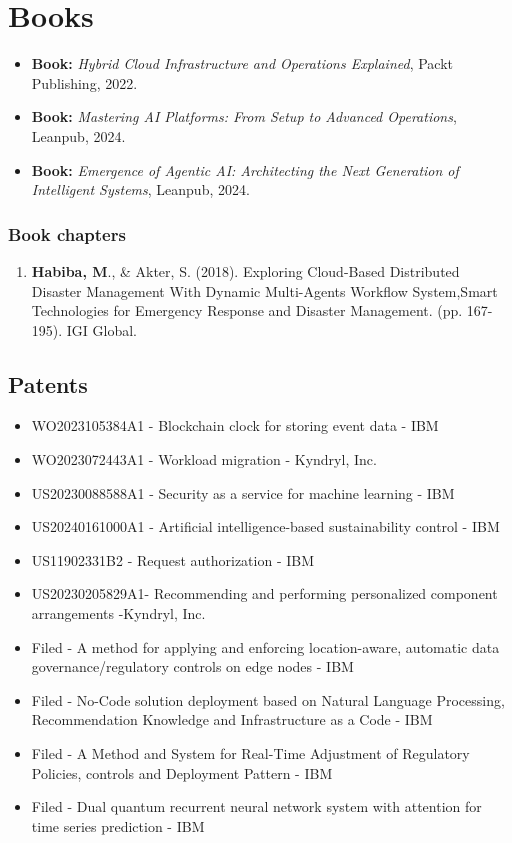 \documentclass[12pt,parskip=half]{scrartcl}
\begin{document}
\section*{Books}
\begin{itemize}
    \item \textbf{Book:} \emph{Hybrid Cloud Infrastructure and Operations Explained}, Packt Publishing, 2022.
    \item \textbf{Book:} \emph{Mastering AI Platforms: From Setup to Advanced Operations}, Leanpub, 2024.
    \item \textbf{Book:} \emph{Emergence of Agentic AI: Architecting the Next Generation of Intelligent Systems}, Leanpub, 2024.
\end{itemize}

\subsubsection{Book chapters}\label{book-chapters}

\begin{enumerate}
  \leftskip-0.13in %
  \item \textbf{Habiba, M}., \& Akter, S. (2018). Exploring Cloud-Based Distributed Disaster Management With Dynamic Multi-Agents Workflow System,Smart Technologies for Emergency Response and Disaster Management. (pp. 167-195). IGI Global.
\end{enumerate}


\vspace{0.3cm}

\subsection{Patents}

\begin{itemize}
    \item WO2023105384A1 - Blockchain clock for storing event data - IBM
    \item WO2023072443A1 - Workload migration - Kyndryl, Inc.
    \item US20230088588A1 - Security as a service for machine learning - IBM
    \item US20240161000A1 - Artificial intelligence-based sustainability control - IBM
    \item US11902331B2 - Request authorization - IBM
    \item US20230205829A1- Recommending and performing personalized component arrangements -Kyndryl, Inc.
    \item Filed - A method for applying and enforcing location-aware, automatic data governance/regulatory controls on edge nodes - IBM
    \item Filed - No-Code solution deployment based on Natural Language Processing, Recommendation Knowledge and Infrastructure as a Code - IBM 
    \item Filed - A Method and System for Real-Time Adjustment of Regulatory Policies, controls and Deployment Pattern - IBM 
    \item Filed - Dual quantum recurrent neural network system with attention for time series prediction - IBM
\end{itemize}
\end{document}
